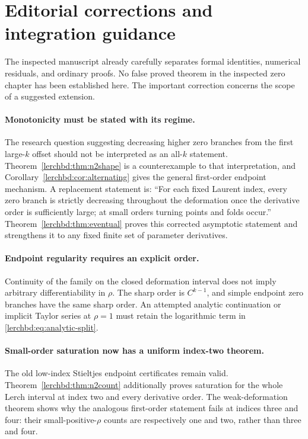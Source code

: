 \section{Editorial corrections and integration guidance}\label{lerchbd:sec:editorial}
The inspected manuscript already carefully separates formal identities, numerical residuals, and ordinary proofs. No false proved theorem in the inspected zero chapter has been established here. The important correction concerns the scope of a suggested extension.

\paragraph{Monotonicity must be stated with its regime.}
The research question suggesting decreasing higher zero branches from the first large-$k$ offset should not be interpreted as an all-$k$ statement. Theorem~\ref{lerchbd:thm:n2shape} is a counterexample to that interpretation, and Corollary~\ref{lerchbd:cor:alternating} gives the general first-order endpoint mechanism. A replacement statement is: ``For each fixed Laurent index, every zero branch is strictly decreasing throughout the deformation once the derivative order is sufficiently large; at small orders turning points and folds occur.'' Theorem~\ref{lerchbd:thm:eventual} proves this corrected asymptotic statement and strengthens it to any fixed finite set of parameter derivatives.

\paragraph{Endpoint regularity requires an explicit order.}
Continuity of the family on the closed deformation interval does not imply arbitrary differentiability in $\rho$. The sharp order is $C^{k-1}$, and simple endpoint zero branches have the same sharp order. An attempted analytic continuation or implicit Taylor series at $\rho=1$ must retain the logarithmic term in \eqref{lerchbd:eq:analytic-split}.

\paragraph{Small-order saturation now has a uniform index-two theorem.}
The old low-index Stieltjes endpoint certificates remain valid. Theorem~\ref{lerchbd:thm:n2count} additionally proves saturation for the whole Lerch interval at index two and every derivative order. The weak-deformation theorem shows why the analogous first-order statement fails at indices three and four: their small-positive-$\rho$ counts are respectively one and two, rather than three and four.

